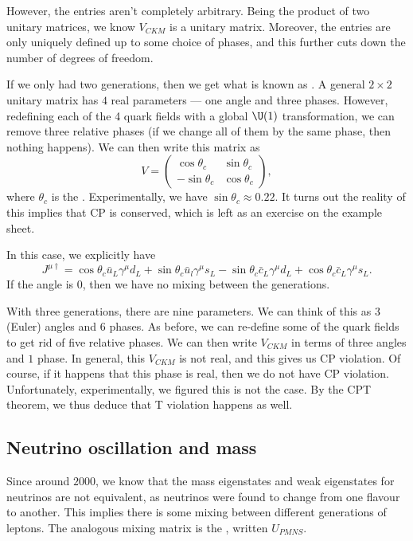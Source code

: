 \documentclass[a4paper]{article}
\begin{document}
However, the entries aren't completely arbitrary. Being the product of two unitary matrices, we know $V_{CKM}$ is a unitary matrix. Moreover, the entries are only uniquely defined up to some choice of phases, and this further cuts down the number of degrees of freedom.

If we only had two generations, then we get what is known as . A general $2 \times 2$ unitary matrix has $4$ real parameters --- one angle and three phases. However, redefining each of the 4 quark fields with a global $\U(1)$ transformation, we can remove three relative phases (if we change all of them by the same phase, then nothing happens). We can then write this matrix as
\[
  V =
  \begin{pmatrix}
    \cos \theta_c & \sin \theta_c\\
    - \sin \theta_c & \cos \theta_c
  \end{pmatrix},
\]
where $\theta_c$ is the . Experimentally, we have $\sin \theta_c \approx 0.22$. It turns out the reality of this implies that CP is conserved, which is left as an exercise on the example sheet.

In this case, we explicitly have
\[
  J^{\mu\dagger} = \cos \theta_c \bar{u}_L \gamma^\mu d_L + \sin \theta_c \bar{u}_l \gamma^\mu s_L - \sin \theta_c \bar{c}_L \gamma^\mu d_L + \cos \theta_c \bar{c}_L \gamma^\mu s_L.
\]
If the angle is $0$, then we have no mixing between the generations.

With three generations, there are nine parameters. We can think of this as $3$ (Euler) angles and $6$ phases. As before, we can re-define some of the quark fields to get rid of five relative phases. We can then write $V_{CKM}$ in terms of three angles and $1$ phase. In general, this $V_{CKM}$ is not real, and this gives us CP violation. Of course, if it happens that this phase is real, then we do not have CP violation. Unfortunately, experimentally, we figured this is not the case. By the CPT theorem, we thus deduce that T violation happens as well.

\subsection{Neutrino oscillation and mass}
Since around $2000$, we know that the mass eigenstates and weak eigenstates for neutrinos are not equivalent, as neutrinos were found to change from one flavour to another. This implies there is some mixing between different generations of leptons. The analogous mixing matrix is the , written $U_{PMNS}$.
\end{document}
